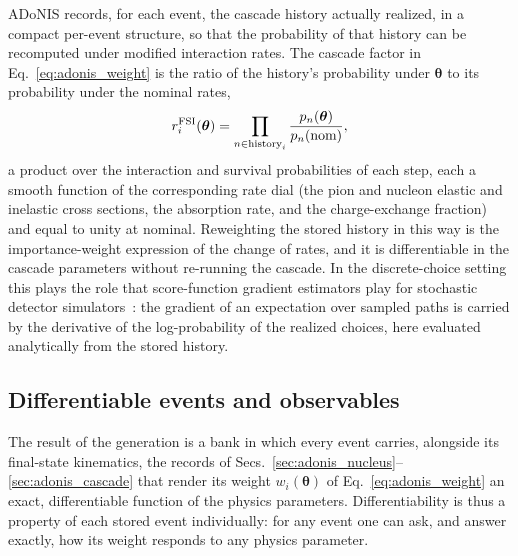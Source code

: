 \documentclass[aps,prd,reprint,superscriptaddress,nofootinbib,amsmath,amssymb,floatfix]{revtex4-1}
\newcommand{\adonis}{{ADoNIS}\xspace}
\begin{document}
\adonis records, for each event, the cascade history actually realized, in a
compact per-event structure, so that the probability of that history can be
recomputed under modified interaction rates. The cascade factor in
Eq.~\ref{eq:adonis_weight} is the ratio of the history's probability under
$\bm\theta$ to its probability under the nominal rates,
\begin{equation}
r^{\rm FSI}_i(\bm\theta)
= \prod_{n \in \text{history}_i}
\frac{p_n(\bm\theta)}{p_n(\text{nom})},
\end{equation}
a product over the interaction and survival probabilities of each step, each a
smooth function of the corresponding rate dial (the pion and nucleon elastic and
inelastic cross sections, the absorption rate, and the charge-exchange fraction)
and equal to unity at nominal. Reweighting the stored history in this way is the
importance-weight expression of the change of rates, and it is differentiable in
the cascade parameters without re-running the cascade. In the discrete-choice
setting this plays the role that score-function gradient estimators play for
stochastic detector simulators~\cite{LUCiD}: the gradient of an expectation over
sampled paths is carried by the derivative of the log-probability of the realized
choices, here evaluated analytically from the stored history.

\subsection{Differentiable events and observables}
\label{sec:adonis_events}

The result of the generation is a bank in which every event carries, alongside
its final-state kinematics, the records of
Secs.~\ref{sec:adonis_nucleus}--\ref{sec:adonis_cascade} that render its weight
$w_i(\bm\theta)$ of Eq.~\ref{eq:adonis_weight} an exact, differentiable function
of the physics parameters. Differentiability is thus a property of each stored
event individually: for any event one can ask, and answer exactly, how its weight
responds to any physics parameter.
\end{document}
